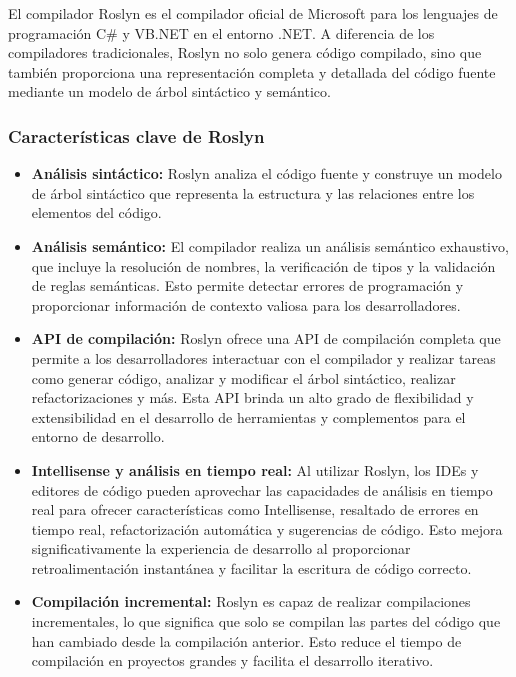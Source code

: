 \documentclass[executivepaper]{article}
\begin{document}
El compilador Roslyn es el compilador oficial de Microsoft para los lenguajes de programación C\# y VB.NET en el entorno .NET. A diferencia de los compiladores tradicionales, Roslyn no solo genera código compilado, sino que también proporciona una representación completa y detallada del código fuente mediante un modelo de árbol sintáctico y semántico.

\subsubsection*{Características clave de Roslyn}

\begin{itemize}
  \item \textbf{Análisis sintáctico:} Roslyn analiza el código fuente y construye un modelo de árbol sintáctico que representa la estructura y las relaciones entre los elementos del código.

  \item \textbf{Análisis semántico:} El compilador realiza un análisis semántico exhaustivo, que incluye la resolución de nombres, la verificación de tipos y la validación de reglas semánticas. Esto permite detectar errores de programación y proporcionar información de contexto valiosa para los desarrolladores.

  \item \textbf{API de compilación:} Roslyn ofrece una API de compilación completa que permite a los desarrolladores interactuar con el compilador y realizar tareas como generar código, analizar y modificar el árbol sintáctico, realizar refactorizaciones y más. Esta API brinda un alto grado de flexibilidad y extensibilidad en el desarrollo de herramientas y complementos para el entorno de desarrollo.

  \item \textbf{Intellisense y análisis en tiempo real:} Al utilizar Roslyn, los IDEs y editores de código pueden aprovechar las capacidades de análisis en tiempo real para ofrecer características como Intellisense, resaltado de errores en tiempo real, refactorización automática y sugerencias de código. Esto mejora significativamente la experiencia de desarrollo al proporcionar retroalimentación instantánea y facilitar la escritura de código correcto.

  \item \textbf{Compilación incremental:} Roslyn es capaz de realizar compilaciones incrementales, lo que significa que solo se compilan las partes del código que han cambiado desde la compilación anterior. Esto reduce el tiempo de compilación en proyectos grandes y facilita el desarrollo iterativo.
\end{itemize}
\end{document}
